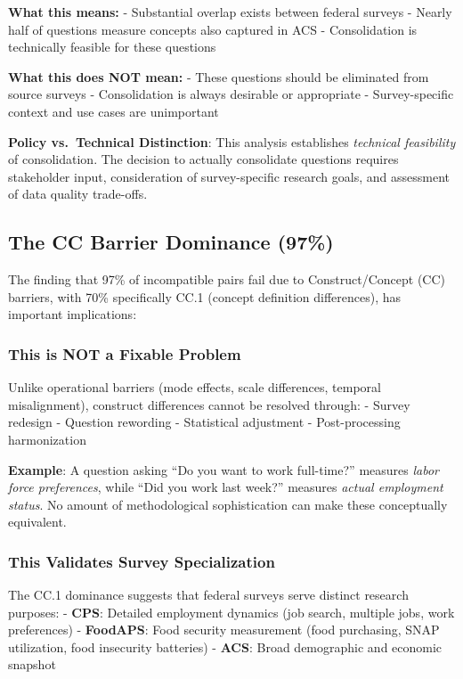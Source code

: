 \documentclass[
  letterpaper,
]{report}
\begin{document}
\textbf{What this means:} - Substantial overlap exists between federal
surveys - Nearly half of questions measure concepts also captured in ACS
- Consolidation is technically feasible for these questions

\textbf{What this does NOT mean:} - These questions should be eliminated
from source surveys - Consolidation is always desirable or appropriate -
Survey-specific context and use cases are unimportant

\textbf{Policy vs.~Technical Distinction}: This analysis establishes
\emph{technical feasibility} of consolidation. The decision to actually
consolidate questions requires stakeholder input, consideration of
survey-specific research goals, and assessment of data quality
trade-offs.

\subsection{The CC Barrier Dominance
(97\%)}\label{the-cc-barrier-dominance-97}

The finding that 97\% of incompatible pairs fail due to
Construct/Concept (CC) barriers, with 70\% specifically CC.1 (concept
definition differences), has important implications:

\subsubsection{This is NOT a Fixable
Problem}\label{this-is-not-a-fixable-problem}

Unlike operational barriers (mode effects, scale differences, temporal
misalignment), construct differences cannot be resolved through: -
Survey redesign - Question rewording - Statistical adjustment -
Post-processing harmonization

\textbf{Example}: A question asking ``Do you want to work full-time?''
measures \emph{labor force preferences}, while ``Did you work last
week?'' measures \emph{actual employment status}. No amount of
methodological sophistication can make these conceptually equivalent.

\subsubsection{This Validates Survey
Specialization}\label{this-validates-survey-specialization}

The CC.1 dominance suggests that federal surveys serve distinct research
purposes: - \textbf{CPS}: Detailed employment dynamics (job search,
multiple jobs, work preferences) - \textbf{FoodAPS}: Food security
measurement (food purchasing, SNAP utilization, food insecurity
batteries) - \textbf{ACS}: Broad demographic and economic snapshot
\end{document}
